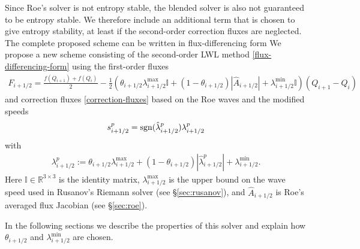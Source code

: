 \documentclass[preprint, 11pt]{article}
\newcommand{\iph}{{i+1/2}}
\newcommand{\bff}{{f}}
\newcommand{\bfF}{{F}}
\newcommand{\bfq}{{Q}}
\newcommand{\sgn}{{\rm sgn}}
\begin{document}
Since Roe's solver is not entropy stable, the blended solver is also
not guaranteed to be entropy stable.  We therefore include an additional term
that is chosen to give entropy stability, at least if the second-order correction
fluxes are neglected.  The complete proposed scheme can be written in
flux-differencing form 
We propose
a new scheme consisting of the second-order LWL method \eqref{flux-differencing-form} using
the first-order fluxes
\begin{align} \label{blended-flux-1}
  \bfF_{i+1/2} = \frac{\bff(\bfq_{i+1})+\bff(\bfq_i)}{2}
  - \frac{1}{2} \left( \theta_{i+1/2}\lambda_{i+1/2}^{\max}\mathbb{I} + (1-\theta_{i+1/2})|\hat A_{i+1/2}| +\lambda_{i+1/2}^{\min}\mathbb{I}\right)(\bfq_{i+1}-\bfq_{i})
\end{align}
and correction fluxes \eqref{correction-fluxes} based on the Roe waves and
the modified speeds
\begin{align} \label{s_p}
    s_{i+1/2}^p=\sgn(\hat\lambda_{i+1/2}^p)\lambda_{i+1/2}^p
\end{align}
with
\begin{align}\label{lambda_p}
  \lambda_{i+1/2}^p := \theta_{i+1/2}\lambda_{i+1/2}^{\max} + (1-\theta_{i+1/2})|\hat \lambda_{i+1/2}^p| + \lambda_\iph^{\min}.
\end{align}
Here $\mathbb{I}\in\mathbb{R}^{3\times 3}$ is the identity matrix,
$\lambda_{i+1/2}^{\max}$ is the
upper bound on the wave speed used in Rusanov's Riemann solver (see \S \ref{sec:rusanov}),
and $\hat A_{i+1/2}$ is Roe's averaged flux Jacobian (see \S \ref{sec:roe}).

In the following sections we describe the properties of this solver and
explain how $\theta_\iph$ and $\lambda^{\min}_\iph$ are chosen.


%
\end{document}
